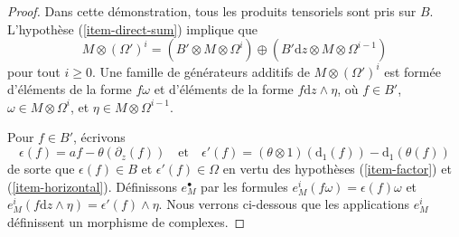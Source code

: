 \begin{proof}
Dans cette démonstration, tous les produits tensoriels sont pris sur $B$.
L'hypothèse (\ref{item-direct-sum}) implique que
$$
M \otimes (\Omega')^i =
(B' \otimes M \otimes \Omega^i)
\oplus
(B' \text{d}z \otimes M \otimes \Omega^{i - 1})
$$
pour tout $i \geq 0$. Une famille de générateurs additifs de
$M \otimes (\Omega')^i$ est formée d'éléments de la forme
$f \omega$ et d'éléments de la forme $f \text{d}z \wedge \eta$,
où $f \in B'$, $\omega \in M \otimes \Omega^i$, et
$\eta \in M \otimes \Omega^{i - 1}$.

\medskip\noindent
Pour $f \in B'$, écrivons
$$
\epsilon(f) = af - \theta(\partial_z(f))
\quad\text{et}\quad
\epsilon'(f) = (\theta \otimes 1)(\text{d}_1(f)) - \text{d}_1(\theta(f))
$$
de sorte que $\epsilon(f) \in B$ et $\epsilon'(f) \in \Omega$ en vertu des
hypothèses (\ref{item-factor}) et (\ref{item-horizontal}).
Définissons $e_M^\bullet$ par les formules
$e^i_M(f\omega) = \epsilon(f) \omega$ et
$e^i_M(f \text{d}z \wedge \eta) = \epsilon'(f) \wedge \eta$.
Nous verrons ci-dessous que les applications $e^i_M$ définissent un morphisme de complexes.


\end{proof}
